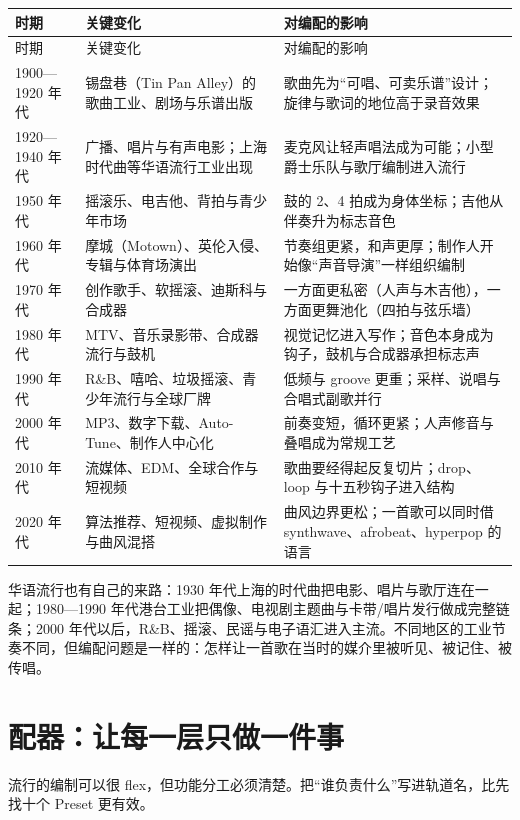 \begin{longtable}{p{}p{}p{}}
\toprule
时期 & 关键变化 & 对编配的影响 \\
\midrule
\endfirsthead
\toprule
时期 & 关键变化 & 对编配的影响 \\
\midrule
\endhead
1900—1920 年代 & 锡盘巷（Tin Pan Alley）的歌曲工业、剧场与乐谱出版 & 歌曲先为“可唱、可卖乐谱”设计；旋律与歌词的地位高于录音效果 \\
1920—1940 年代 & 广播、唱片与有声电影；上海时代曲等华语流行工业出现 & 麦克风让轻声唱法成为可能；小型爵士乐队与歌厅编制进入流行 \\
1950 年代 & 摇滚乐、电吉他、背拍与青少年市场 & 鼓的 2、4 拍成为身体坐标；吉他从伴奏升为标志音色 \\
1960 年代 & 摩城（Motown）、英伦入侵、专辑与体育场演出 & 节奏组更紧，和声更厚；制作人开始像“声音导演”一样组织编制 \\
1970 年代 & 创作歌手、软摇滚、迪斯科与合成器 & 一方面更私密（人声与木吉他），一方面更舞池化（四拍与弦乐墙） \\
1980 年代 & MTV、音乐录影带、合成器流行与鼓机 & 视觉记忆进入写作；音色本身成为钩子，鼓机与合成器承担标志声 \\
1990 年代 & R\&B、嘻哈、垃圾摇滚、青少年流行与全球厂牌 & 低频与 groove 更重；采样、说唱与合唱式副歌并行 \\
2000 年代 & MP3、数字下载、Auto-Tune、制作人中心化 & 前奏变短，循环更紧；人声修音与叠唱成为常规工艺 \\
2010 年代 & 流媒体、EDM、全球合作与短视频 & 歌曲要经得起反复切片；drop、loop 与十五秒钩子进入结构 \\
2020 年代 & 算法推荐、短视频、虚拟制作与曲风混搭 & 曲风边界更松；一首歌可以同时借 synthwave、afrobeat、hyperpop 的语言 \\
\bottomrule
\end{longtable}

华语流行也有自己的来路：1930 年代上海的时代曲把电影、唱片与歌厅连在一起；1980—1990 年代港台工业把偶像、电视剧主题曲与卡带/唱片发行做成完整链条；2000 年代以后，R\&B、摇滚、民谣与电子语汇进入主流。不同地区的工业节奏不同，但编配问题是一样的：怎样让一首歌在当时的媒介里被听见、被记住、被传唱。

\section{配器：让每一层只做一件事}
\label{sec:pop-craft}

流行的编制可以很 flex，但功能分工必须清楚。把“谁负责什么”写进轨道名，比先找十个 Preset 更有效。

